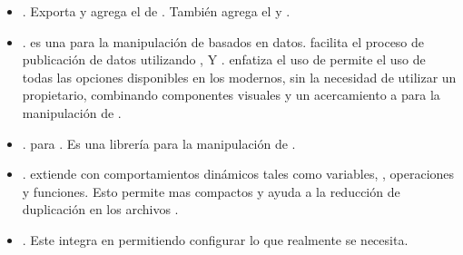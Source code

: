 \begin{itemize}
		\item
			\textbf{\bunyanPackage}. Exporta y agrega el \moduleAS de \loggingCPT \bunyanNAME. También agrega el \clientAS \browserifyNAME y \bunyanprettyStreamMETEOR.
		\item
			\textbf{\dThreePackage}. \dddNAME es una \libraryPC	\javaScriptNAME para la manipulación de  \documentsDB basados en datos. \dThreePackage facilita el proceso de publicación de datos utilizando \htmlNAME, \svgNAME Y \cssNAME. \dThreePackage enfatiza el uso de \webStandardINT permite el uso de todas las opciones disponibles en los \browsersINT modernos, sin la necesidad de utilizar un \frameworkPC propietario, combinando componentes visuales y un acercamiento a \dataDrivenCPT para la manipulación de \htmldomNAME.
		\item
			\textbf{\undStringLatestPackage}. \undStringLatestMETEOR \packageAS para \meteorNAME. Es una librería para la manipulación de \stringsPL.
		\item
			\textbf{\lessPackage}. \lessNAME extiende \cssNAME con comportamientos dinámicos tales como variables, \mixinsNAME, operaciones y funciones. Esto permite  \stylesheetsNAME mas compactos y ayuda a la reducción de duplicación en los archivos \cssNAME. 



		\item
			\textbf{\bootstrapPackage}. Este \packageAS integra \bootstrapNAME en \meteorNAME permitiendo configurar lo que realmente se necesita.
	\end{itemize}


